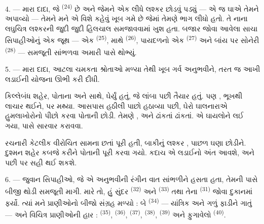 \VUsaut{4.0mm}
\VUsaut{2.8mm}

4. --- મારા દાદા, જે  \textsuperscript{(24)} છે અને જેમને
એક  લીધે લશ્કર છોડવું પડ્યું — એ જ ઘાએ તેમને
 અપાવ્યો — તેમને મને એ  વિશે કહેવું
ખૂબ ગમે છે જેમાં તેમણે ભાગ લીધો હતો. તે નાના લઘુચિત્ર લશ્કરની જુદી
જુદી હિલચાલ સમજાવવામાં ખુશ હતા. બજાર જોવા આવેલા સાચા સિપાહીઓનું એક
જૂથ — એક  \textsuperscript{(25)}, માથે
 
\textsuperscript{(26)}, પાયદળનો એક 
\textsuperscript{(27)} અને બાંય પર સોનેરી 
 \textsuperscript{(28)} — સમજૂતી સાંભળવા
અમારી પાસે થોભ્યું.

5. --- મારા દાદા, આટલા ચમકતા શ્રોતાઓ મળ્યા તેથી ખૂબ ગર્વ અનુભવીને,
તરત જ આખી લડાઈની યોજના ઊભી કરી દીધી.

કિલ્લેબંધ શહેર, પોતાના  અને  સાથે,
 ઘેર્યું હતું, જે લાંબા  પછી
 તૈયાર હતું. પણ , ભૂખથી લાચાર
થઈને,   પર 
મથ્યા.  આસપાસ હઠીલી  
પાછો હઠાવ્યા પછી,  ઘેરો ઘાલનારાએ 
હુમલાખોરોનો પીછો કરવા પોતાની  છોડી. તેમણે
,   અને
 ઢાંકતાં ઢાંકતાં.  એ ઘાયલોને
 લઈ ગયા,  પાસે સારવાર કરાવવા.

 રચનારી કેટલીક  વીરોચિત સામના છતાં
 પૂરી હતી, બાકીનું લશ્કર , પાછળ ઘણા
 છોડીને. દુશ્મન શહેર કબજે કરીને પોતાની 
પૂરી કરવા ગયો. કદાચ એ લડાઈનો અંત આવશે, અને  પછી
 પર સહી થઈ શકશે.

\VUsaut{4.4mm}
\VUsaut{2.8mm}

6. --- જુવાન સિપાહીઓ, જે એ અનુભવીની રંગીન વાત સાંભળીને હસતા હતા,
તેમની પાસે બીજી થોડી સમજૂતી માગી. મારે તો, હું સુંદર 
\textsuperscript{(32)} અને  \textsuperscript{(33)} તથા
તેના  \textsuperscript{(31)} જોવા દુકાનમાં ફર્યો. ત્યાં
મને પ્રાણીઓનો બીજો સંગ્રહ મળ્યો : બે 
\textsuperscript{(34)} — યાંત્રિક  અને ગળું ફાડીને
ગાતું  — અને વિચિત્ર પ્રાણીઓની હાર :
 \textsuperscript{(35)}, 
\textsuperscript{(36)},  \textsuperscript{(37)},
 \textsuperscript{(38)}, 
\textsuperscript{(39)} અને ફુગાવેલો 
\textsuperscript{(40)}.

